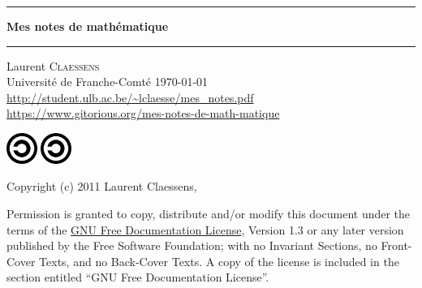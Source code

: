 \thispagestyle{empty}
\begin{center}
  \begin{minipage}{15cm}
    \hrule\par
    \vspace{2mm}
    \begin{center}
    \Huge \bfseries Mes notes de mathématique \par
    \end{center}
    \hrule\par
  \end{minipage}
\end{center}

\vspace{2cm}

\begin{center}
    Laurent \textsc{Claessens}\\
    Université de Franche-Comté
    \today\\
    \url{http://student.ulb.ac.be/~lclaesse/mes_notes.pdf}\\
    \url{https://www.gitorious.org/mes-notes-de-math-matique}
\end{center}

\vfill

\begin{center}

           \ifpdf
            \includegraphics[width=1cm]{Copyleft.svg}
        \else
            \includegraphics[width=1cm]{Copyleft.eps}
        \fi

Copyright (c) 2011  Laurent Claessens,

Permission is granted to copy, distribute and/or modify this document under the terms of the \href{http://www.gnu.org/licenses/fdl-1.3.html}{GNU Free Documentation License}, Version 1.3 or any later version published by the Free Software Foundation; with no Invariant Sections, no Front-Cover Texts, and no Back-Cover Texts. A copy of the license is included in the section entitled ``GNU Free Documentation License''.




\end{center}

\clearpage

